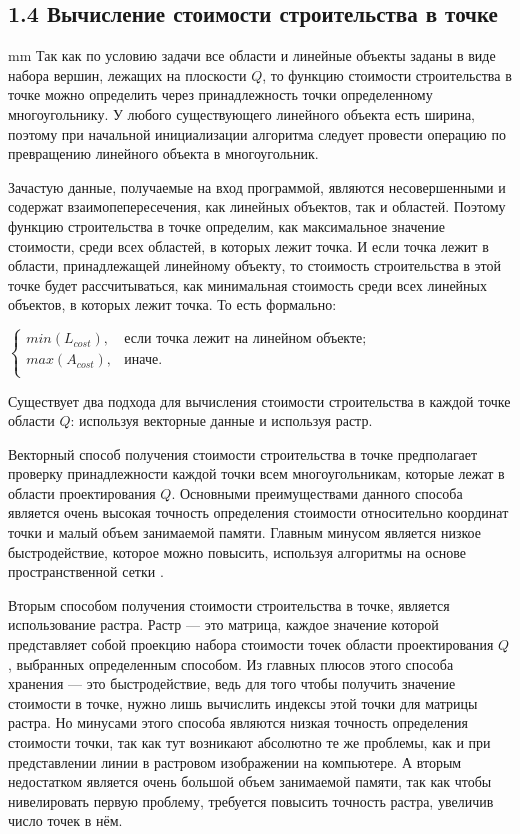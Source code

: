 \subsection*{\Large{1.4 Вычисление стоимости строительства в точке}}
 mm
Так как по условию задачи все области и линейные объекты заданы в виде набора вершин, лежащих на плоскости $Q$, то функцию стоимости строительства в точке можно определить через принадлежность точки определенному многоугольнику. У любого существующего линейного объекта есть ширина, поэтому при начальной инициализации алгоритма следует провести операцию по превращению линейного объекта в многоугольник. 
\par
Зачастую данные, получаемые на вход программой, являются несовершенными и содержат взаимопепересечения, как линейных объектов, так и областей. Поэтому функцию строительства в точке определим, как максимальное значение стоимости, среди всех областей, в которых лежит точка. И если точка лежит в области, принадлежащей линейному объекту, то стоимость строительства в этой точке будет рассчитываться, как минимальная стоимость среди всех линейных объектов, в которых лежит точка. То есть формально:

$\begin{cases}
	min(L_{cost}), & \text{если точка лежит на линейном объекте}; \\
	max(A_{cost}), & \text{иначе}. \\
\end{cases}$

Существует два подхода для вычисления стоимости строительства в каждой точке области $Q$: используя векторные данные и используя растр.
\par
Векторный способ получения стоимости строительства в точке предполагает проверку принадлежности каждой точки всем многоугольникам, которые лежат в области проектирования $Q$. Основными преимуществами данного способа является очень высокая точность определения стоимости относительно координат точки и малый объем занимаемой памяти. Главным минусом является низкое быстродействие, которое можно повысить, используя алгоритмы на основе пространственной сетки \cite{SpatialIndex}.
\par
Вторым способом получения стоимости строительства в точке, является использование растра. Растр --- это матрица, каждое значение которой представляет собой проекцию набора стоимости точек области проектирования $Q$, выбранных определенным способом. Из главных плюсов этого способа хранения --- это быстродействие, ведь для того чтобы получить значение стоимости в точке, нужно лишь вычислить индексы этой точки для матрицы растра. Но минусами этого способа являются низкая точность определения стоимости точки, так как тут возникают абсолютно те же проблемы, как и при представлении линии в растровом изображении на компьютере. А вторым недостатком является очень большой объем занимаемой памяти, так как чтобы нивелировать первую проблему, требуется повысить точность растра, увеличив число точек в нём.


